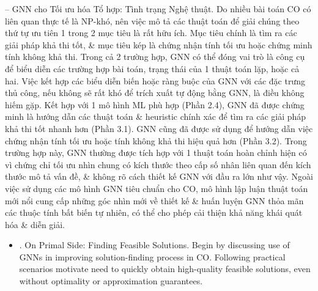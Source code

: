 \documentclass{article}
\begin{document}
\begin{itemize}
    -- {\sf GNN cho Tối ưu hóa Tổ hợp: Tình trạng Nghệ thuật.} Do nhiều bài toán CO có liên quan thực tế là NP-khó, nên việc mô tả các thuật toán để giải chúng theo thứ tự ưu tiên 1 trong 2 mục tiêu là rất hữu ích. Mục tiêu chính là tìm ra các giải pháp khả thi tốt, \& mục tiêu kép là chứng nhận tính tối ưu hoặc chứng minh tính không khả thi. Trong cả 2 trường hợp, GNN có thể đóng vai trò là công cụ để biểu diễn các trường hợp bài toán, trạng thái của 1 thuật toán lặp, hoặc cả hai. Việc kết hợp các biểu diễn biến hoặc ràng buộc của GNN với các đặc trưng thủ công, nếu không sẽ rất khó để trích xuất tự động bằng GNN, là điều không hiếm gặp. Kết hợp với 1 mô hình ML phù hợp (Phần 2.4), GNN đã được chứng minh là hướng dẫn các thuật toán \& heuristic chính xác để tìm ra các giải pháp khả thi tốt nhanh hơn (Phần 3.1). GNN cũng đã được sử dụng để hướng dẫn việc chứng nhận tính tối ưu hoặc tính không khả thi hiệu quả hơn (Phần 3.2). Trong trường hợp này, GNN thường được tích hợp với 1 thuật toán hoàn chỉnh hiện có vì chứng chỉ tối ưu nhìn chung có kích thước theo cấp số nhân liên quan đến kích thước mô tả vấn đề, \& không rõ cách thiết kế GNN với đầu ra lớn như vậy. Ngoài việc sử dụng các mô hình GNN tiêu chuẩn cho CO, mô hình lập luận thuật toán mới nổi cung cấp những góc nhìn mới về thiết kế \& huấn luyện GNN thỏa mãn các thuộc tính bất biến tự nhiên, có thể cho phép cải thiện khả năng khái quát hóa \& diễn giải.
    \begin{itemize}
        \item {. On Primal Side: Finding Feasible Solutions.} Begin by discussing use of GNNs in improving solution-finding process in CO. Following practical scenarios motivate need to quickly obtain high-quality feasible solutions, even without optimality or approximation guarantees.


\end{itemize}
\end{itemize}
\end{document}
